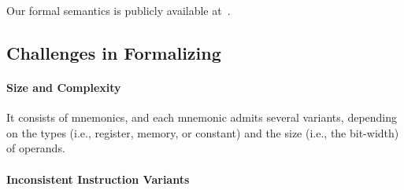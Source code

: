 Our formal semantics is publicly available at~\cite{x86-64-github}.






\subsection{Challenges in Formalizing \ISA}
\label{sec:challenges-in-formalizing-x86}


\paragraph{Size and Complexity}

It consists of \totalIntel{} mnemonics, and each mnemonic admits several variants, depending on the types (i.e., register, memory, or constant) and the size (i.e., the bit-width) of operands.

\vspace{-2pt}
\paragraph{Inconsistent Instruction Variants}

